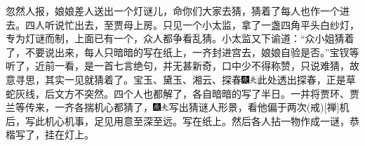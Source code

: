 忽然人报，娘娘差人送出一个灯谜儿，命你们大家去猜，猜着了每人也作一个进去。四人听说忙出去，至贾母上房。只见一个小太监，拿了一盏四角平头白纱灯，专为灯谜而制，上面已有一个，众人都争看乱猜。小太监又下谕道：“众小姐猜着了，不要说出来，每人只暗暗的写在纸上，一齐封进宫去，娘娘自验是否。”宝钗等听了，近前一看，是一首七言绝句，并无甚新奇，口中少不得称赞，只说难猜，故意寻思，其实一见就猜着了。宝玉、黛玉、湘云、探春{\includegraphics[width=3mm]{../Images/00004}\includegraphics[width=3mm]{../Images/00012}\footnotesize \kaishu 此处透出探春，正是草蛇灰线，后文方不突然。}四个人也都解了，各自暗暗的写了半日。一并将贾环、贾兰等传来，一齐各揣机心都猜了，{\includegraphics[width=3mm]{../Images/00004}\includegraphics[width=3mm]{../Images/00012}\footnotesize \kaishu 写出猜谜人形景，看他偏于两次{(戒)}{[}禅{]}机后，写此机心机事，足见用意至深至远。}写在纸上。然后各人拈一物作成一谜，恭楷写了，挂在灯上。

